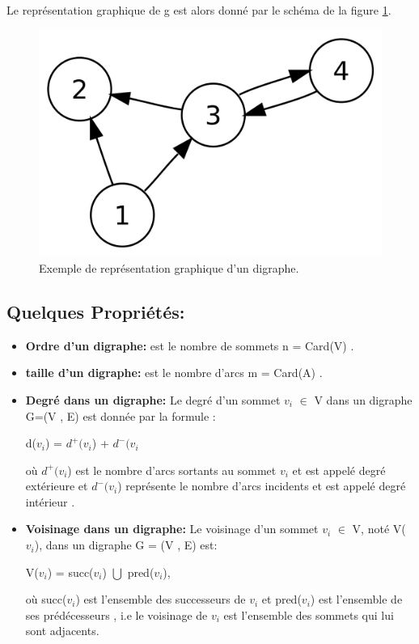 		Le représentation graphique de g est alors donné par le schéma de la figure \ref{grapheOr}.
	
		
			\begin{figure}[h]
			\includegraphics[scale=0.15,center]{./ressources/image/RepDiGraphe.png}
			\caption[Exemple de représentation graphique d'un digraphe.]{Exemple de représentation graphique d'un digraphe.}
			\label{grapheOr}
			\end{figure}
			
		
		\subsection{Quelques Propriétés:} %
			\begin{itemize}[label=$\circ$]
			\item\textbf{Ordre d'un digraphe:}
			est le nombre de sommets n = Card(V) \citep{DUT}.
			
			\item\textbf{taille d'un digraphe:} est le nombre d’arcs m = Card(A) \citep{DUT}.
			
			\item\textbf{Degré dans un digraphe:}
			Le degré d'un sommet $v_{i}$ $\in$ V dans un digraphe G=(V , E) est donnée par la formule :
			\begin{center}
				d($v_{i}$) = $d^+(v_{i}$) + $d^-(v_{i}$\\
			\end{center}			 
			 où $d^+(v_{i}$) est le nombre d'arcs sortants au sommet $v_{i}$ et est appelé degré extérieure et $d^-(v_{i}$) représente le nombre d'arcs incidents et est appelé degré intérieur \citep{muller}.
			 
			 \item\textbf{Voisinage dans un digraphe:}
			 Le voisinage d'un sommet $v_{i}$ $\in$ V, noté V($v_{i}$), dans un digraphe G = (V , E) est:
			 	\begin{center}
				V($v_{i}$) = succ($v_{i}$) $\bigcup$ pred($v_{i}$),
				\end{center}
				
				où succ($v_{i}$) est l'ensemble des successeurs de $v_{i}$ et pred($v_{i}$) est l'ensemble de ses prédécesseurs \citep{bac}, i.e le voisinage de $v_{i}$ est l'ensemble des sommets qui lui sont adjacents.
			
			\end{itemize}
			